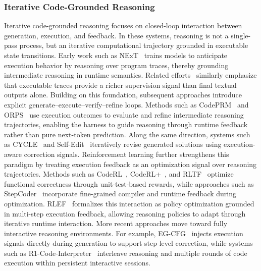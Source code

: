 \subsubsection{Iterative Code-Grounded Reasoning}
Iterative code-grounded reasoning focuses on closed-loop
interaction between generation, execution, and feedback.
In these systems, reasoning is not a single-pass process, but an
iterative computational trajectory grounded in executable state
transitions.
Early work such as NExT~\cite{ni2024next} trains models to
anticipate execution behavior by reasoning over program traces,
thereby grounding intermediate reasoning in runtime semantics.
Related efforts~\cite{armengol2025cannot} similarly emphasize
that executable traces provide a richer supervision signal than
final textual outputs alone.
Building on this foundation, subsequent approaches introduce
explicit generate--execute--verify--refine loops.
Methods such as CodePRM~\cite{li2025codeprm} and
ORPS~\cite{yu2024reasoning} use execution outcomes to evaluate
and refine intermediate reasoning trajectories, enabling the
harness to guide reasoning through runtime feedback rather than
pure next-token prediction.
Along the same direction, systems such as
CYCLE~\cite{ding2024cycle} and
Self-Edit~\cite{zhang2023self} iteratively revise generated
solutions using execution-aware correction signals.
Reinforcement learning further strengthens this paradigm by
treating execution feedback as an optimization signal over
reasoning trajectories.
Methods such as CodeRL~\cite{le2022coderl},
CodeRL+~\cite{jiang2025coderl+}, and
RLTF~\cite{liu2023rltf} optimize functional correctness through
unit-test-based rewards, while approaches such as
StepCoder~\cite{dou2024stepcoder} incorporate fine-grained
compiler and runtime feedback during optimization.
RLEF~\cite{gehring2024rlef} formalizes this interaction as
policy optimization grounded in multi-step execution feedback,
allowing reasoning policies to adapt through iterative runtime
interaction.
More recent approaches move toward fully interactive reasoning
environments.
For example, EG-CFG~\cite{lavon2025execution} injects execution
signals directly during generation to support step-level
correction, while systems such as
R1-Code-Interpreter~\cite{chen2025r1} interleave reasoning and
multiple rounds of code execution within persistent interactive
sessions.




